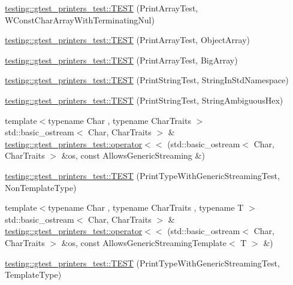 \begin{DoxyCompactItemize}
\item 
\hyperlink{namespacetesting_1_1gtest__printers__test_a6a7cbcdbe748a1d4e90658f48f36c9da}{testing\+::gtest\+\_\+printers\+\_\+test\+::\+T\+E\+ST} (Print\+Array\+Test, W\+Const\+Char\+Array\+With\+Terminating\+Nul)
\item 
\hyperlink{namespacetesting_1_1gtest__printers__test_af91d8ad9d6c7547913fe05c7acc44114}{testing\+::gtest\+\_\+printers\+\_\+test\+::\+T\+E\+ST} (Print\+Array\+Test, Object\+Array)
\item 
\hyperlink{namespacetesting_1_1gtest__printers__test_a596493b56489aa1571fa26d1402e7116}{testing\+::gtest\+\_\+printers\+\_\+test\+::\+T\+E\+ST} (Print\+Array\+Test, Big\+Array)
\item 
\hyperlink{namespacetesting_1_1gtest__printers__test_abbd355e76033f0defd76c37523ad0f60}{testing\+::gtest\+\_\+printers\+\_\+test\+::\+T\+E\+ST} (Print\+String\+Test, String\+In\+Std\+Namespace)
\item 
\hyperlink{namespacetesting_1_1gtest__printers__test_ac20ee165500471e363011c3f664d2fb8}{testing\+::gtest\+\_\+printers\+\_\+test\+::\+T\+E\+ST} (Print\+String\+Test, String\+Ambiguous\+Hex)
\item 
{\footnotesize template$<$typename Char , typename Char\+Traits $>$ }\\std\+::basic\+\_\+ostream$<$ Char, Char\+Traits $>$ \& \hyperlink{namespacetesting_1_1gtest__printers__test_a1eb0213095e639d357692066e8505887}{testing\+::gtest\+\_\+printers\+\_\+test\+::operator$<$$<$} (std\+::basic\+\_\+ostream$<$ Char, Char\+Traits $>$ \&os, const Allows\+Generic\+Streaming \&)
\item 
\hyperlink{namespacetesting_1_1gtest__printers__test_a9272037c799c4779e1d79476dad66cb6}{testing\+::gtest\+\_\+printers\+\_\+test\+::\+T\+E\+ST} (Print\+Type\+With\+Generic\+Streaming\+Test, Non\+Template\+Type)
\item 
{\footnotesize template$<$typename Char , typename Char\+Traits , typename T $>$ }\\std\+::basic\+\_\+ostream$<$ Char, Char\+Traits $>$ \& \hyperlink{namespacetesting_1_1gtest__printers__test_a5464168e925b1adf29986c8e544e908e}{testing\+::gtest\+\_\+printers\+\_\+test\+::operator$<$$<$} (std\+::basic\+\_\+ostream$<$ Char, Char\+Traits $>$ \&os, const Allows\+Generic\+Streaming\+Template$<$ T $>$ \&)
\item 
\hyperlink{namespacetesting_1_1gtest__printers__test_a6e180c85f307712a995985f7bc735fd1}{testing\+::gtest\+\_\+printers\+\_\+test\+::\+T\+E\+ST} (Print\+Type\+With\+Generic\+Streaming\+Test, Template\+Type)

\end{DoxyCompactItemize}
